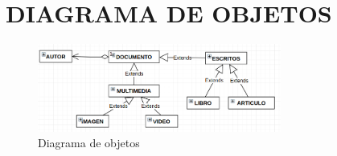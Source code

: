\chapter*{DIAGRAMA DE OBJETOS}
 \begin{figure}[h]
	\centering
	\includegraphics[width=8cm]{images/objeto1}
	\caption{Diagrama de objetos }
	\end{figure}